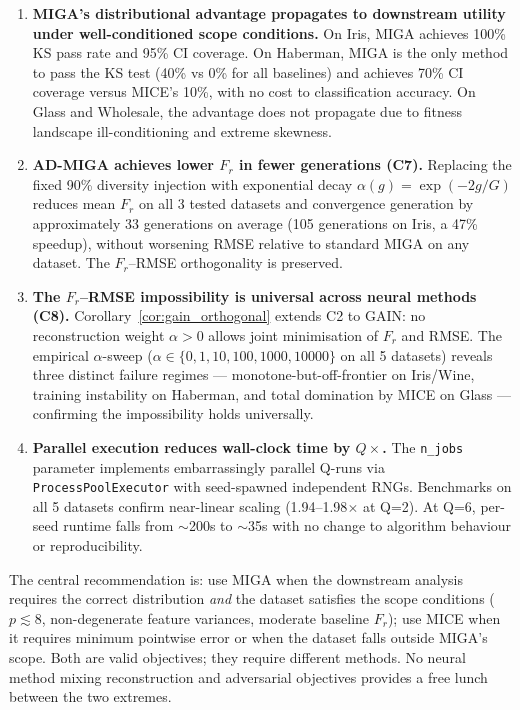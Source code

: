 \begin{enumerate}
    \item \textbf{MIGA's distributional advantage propagates to downstream utility under well-conditioned scope conditions.} On Iris, MIGA achieves 100\% KS pass rate and 95\% CI coverage. On Haberman, MIGA is the only method to pass the KS test (40\% vs 0\% for all baselines) and achieves 70\% CI coverage versus MICE's 10\%, with no cost to classification accuracy. On Glass and Wholesale, the advantage does not propagate due to fitness landscape ill-conditioning and extreme skewness.

    \item \textbf{AD-MIGA achieves lower $F_r$ in fewer generations (C7).} Replacing the fixed 90\% diversity injection with exponential decay $\alpha(g) = \exp(-2g/G)$ reduces mean $F_r$ on all 3 tested datasets and convergence generation by approximately 33 generations on average (105 generations on Iris, a 47\% speedup), without worsening RMSE relative to standard MIGA on any dataset. The $F_r$--RMSE orthogonality is preserved.

    \item \textbf{The $F_r$--RMSE impossibility is universal across neural methods (C8).} Corollary~\ref{cor:gain_orthogonal} extends C2 to GAIN: no reconstruction weight $\alpha > 0$ allows joint minimisation of $F_r$ and RMSE. The empirical $\alpha$-sweep ($\alpha \in \{0,1,10,100,1000,10000\}$ on all 5 datasets) reveals three distinct failure regimes --- monotone-but-off-frontier on Iris/Wine, training instability on Haberman, and total domination by MICE on Glass --- confirming the impossibility holds universally.

    \item \textbf{Parallel execution reduces wall-clock time by $Q\times$.} The \texttt{n\_jobs} parameter implements embarrassingly parallel Q-runs via \texttt{ProcessPoolExecutor} with seed-spawned independent RNGs. Benchmarks on all 5 datasets confirm near-linear scaling (1.94--1.98$\times$ at Q=2). At Q=6, per-seed runtime falls from $\sim$200s to $\sim$35s with no change to algorithm behaviour or reproducibility.
\end{enumerate}

The central recommendation is: use MIGA when the downstream analysis requires the correct distribution \emph{and} the dataset satisfies the scope conditions ($p \lesssim 8$, non-degenerate feature variances, moderate baseline $F_r$); use MICE when it requires minimum pointwise error or when the dataset falls outside MIGA's scope. Both are valid objectives; they require different methods. No neural method mixing reconstruction and adversarial objectives provides a free lunch between the two extremes.
